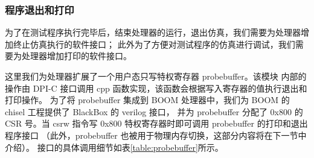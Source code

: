 \subsubsection{程序退出和打印}
为了在测试程序执行完毕后，结束处理器的运行，退出仿真，我们需要为处理器增加终止仿真执行的软件接口；
此外为了方便对测试程序的仿真进行调试，我们需要为处理器增加打印的软件接口。\par

这里我们为处理器扩展了一个用户态只写特权寄存器 probebuffer。该模块
内部的操作由 DPI-C 接口调用 cpp 函数实现，该函数会根据写入寄存器的值执行退出和打印操作。
为了将 probebuffer 集成到 BOOM 处理器中，我们为 BOOM 的chisel 工程提供了 BlackBox 的 verilog 接口，
并为 probebuffer 分配了 0x800 的 CSR 号。当 csrw 指令写 0x800 特权寄存器时即可调用 probebuffer 的打印和退出程序接口
（此外，probebuffer 也被用于物理内存切换，这部分内容将在下一节中介绍）。
接口的具体调用细节如表\ref{table:probebuffer}所示。\par

\begin{table}[h!]
    \begin{center} 
    \caption{probebuffer 软件接口} 
    \label{table:probebuffer}  
    \end{center}
\end{table}


